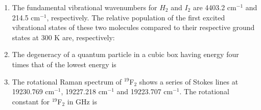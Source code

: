 \documentclass[journal,12pt,onecolumn]{IEEEtran}
\theoremstyle{remark}
\begin{document}
\begin{enumerate}[resume]
\item The fundamental vibrational wavenumbers for 
 $H_2$ and $I_2$ are 4403.2 cm$^{-1}$ and 214.5 cm$^{-1}$, respectively.
 The relative population of the first excited vibrational states of these two molecules compared to their respective ground states at 300 K are, respectively:
    \begin{enumerate}
        \hfill{}
    \end{enumerate}



\item The degeneracy of a quantum particle in a cubic box having energy four times that of the lowest energy is
    \begin{enumerate}
        
 \hfill{}
    \end{enumerate}



\item The rotational Raman spectrum of $^{19}$F$_2$ shows a series of Stokes lines at 19230.769 cm$^{-1}$, 19227.218 cm$^{-1}$ and 19223.707 cm$^{-1}$.
 The rotational constant for $^{19}$F$_2$ in GHz is
    \begin{enumerate}
        \hfill{}
    \end{enumerate}




\end{enumerate}
\end{document}
